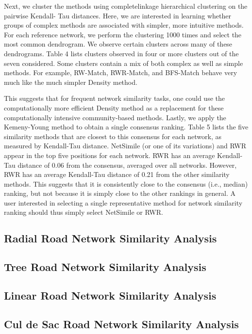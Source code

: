 Next, we cluster the methods using completelinkage
hierarchical clustering on the pairwise Kendall-
Tau distances. Here, we are interested in learning whether groups of complex methods are associated with
simpler, more intuitive methods. For each reference
network, we perform the clustering 1000 times and select
the most common dendrogram. We observe certain
clusters across many of these dendrograms. Table
4 lists clusters observed in four or more clusters out
of the seven considered. Some clusters contain a mix
of both complex as well as simple methods. For example,
RW-Match, RWR-Match, and BFS-Match behave
very much like the much simpler Density method.

This suggests that for frequent network similarity tasks,
one could use the computationally more efficient Density
method as a replacement for these computationally
intensive community-based methods.
Lastly, we apply the Kemeny-Young method to obtain
a single consensus ranking. Table 5 lists the five
similarity methods that are closest to this consensus for
each network, as measured by Kendall-Tau distance.
NetSimile (or one of its variations) and RWR appear
in the top five positions for each network. RWR has
an average Kendall-Tau distance of 0.06 from the consensus,
averaged over all networks. However, RWR has
an average Kendall-Tau distance of 0.21 from the other
similarity methods. This suggests that it is consistently
close to the consensus (i.e., median) ranking, but not
because it is simply close to the other rankings in general.
A user interested in selecting a single representative
method for network similarity ranking should thus
simply select NetSimile or RWR.


\subsection{Radial Road Network Similarity Analysis}
\subsection{Tree Road Network Similarity Analysis}
\subsection{Linear Road Network Similarity Analysis}
\subsection{Cul de Sac Road Network Similarity Analysis}
